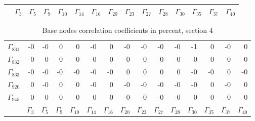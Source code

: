 {\begin{table}
\begin{center}
\begin{minipage}{\linewidth}
\begin{center}
\begin{envsmall}
\begin{center}
\begin{tabular}{rrrrrrrrrrrrrrr}
 & \( \Gamma_{3} \) & \( \Gamma_{5} \) & \( \Gamma_{9} \) & \( \Gamma_{10} \) & \( \Gamma_{14} \) & \( \Gamma_{16} \) & \( \Gamma_{20} \) & \( \Gamma_{23} \) & \( \Gamma_{27} \) & \( \Gamma_{28} \) & \( \Gamma_{30} \) & \( \Gamma_{35} \) & \( \Gamma_{37} \) & \( \Gamma_{40} \)
\\\hline
\end{tabular}
\end{center}
\end{envsmall}
\ifhevea\else
\end{center}
\end{minipage}
\fi
\end{center}
\ifhevea\end{table}\fi
\ifhevea\begin{table}\fi%
\begin{center}
\ifhevea
\caption{Base nodes correlation coefficients in percent, section 4\label{tab:tau:br-fit-corr4}}%
\else
\begin{minipage}{\linewidth}
\begin{center}
\label{tab:tau:br-fit-corr4}%
\fi
\begin{envsmall}
\begin{center}
\renewcommand*{\arraystretch}{1.1}%
\begin{tabular}{rrrrrrrrrrrrrrr}
\hline
\( \Gamma_{831} \) &   -0 &   -0 &    0 &    0 &   -0 &    0 &   -0 &   -0 &   -0 &   -0 &   -1 &    0 &   -0 &    0 \\
\( \Gamma_{832} \) &   -0 &    0 &    0 &    0 &   -0 &    0 &   -0 &   -0 &   -0 &   -0 &   -0 &    0 &   -0 &    0 \\
\( \Gamma_{833} \) &   -0 &   -0 &   -0 &   -0 &   -0 &   -0 &    0 &    0 &    0 &    0 &   -0 &   -0 &    0 &   -0 \\
\( \Gamma_{920} \) &    0 &   -0 &    0 &    0 &   -0 &    0 &   -0 &   -0 &   -0 &   -0 &   -0 &    0 &   -0 &    0 \\
\( \Gamma_{945} \) &    0 &    0 &    0 &    0 &    0 &    0 &   -0 &   -0 &   -0 &   -0 &   -0 &    0 &   -0 &    0 \\
 & \( \Gamma_{3} \) & \( \Gamma_{5} \) & \( \Gamma_{9} \) & \( \Gamma_{10} \) & \( \Gamma_{14} \) & \( \Gamma_{16} \) & \( \Gamma_{20} \) & \( \Gamma_{23} \) & \( \Gamma_{27} \) & \( \Gamma_{28} \) & \( \Gamma_{30} \) & \( \Gamma_{35} \) & \( \Gamma_{37} \) & \( \Gamma_{40} \)
\\\hline

\end{tabular}
\end{center}
\end{envsmall}
\end{center}
\end{minipage}
\end{center}
\end{table}}
